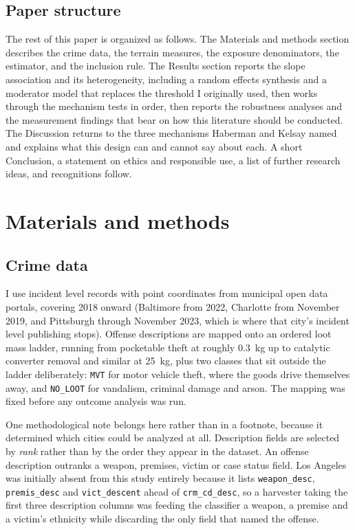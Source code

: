 \documentclass[12pt,letterpaper]{article}
\begin{document}
\subsection{Paper structure}

The rest of this paper is organized as follows. The Materials and methods section
describes the crime data, the terrain measures, the exposure denominators, the
estimator, and the inclusion rule. The Results section reports the slope association
and its heterogeneity, including a random effects synthesis and a moderator model
that replaces the threshold I originally used, then works through the mechanism
tests in order, then reports the robustness analyses and the measurement findings
that bear on how this literature should be conducted. The Discussion returns to the
three mechanisms Haberman and Kelsay named and explains what this design can and
cannot say about each. A short Conclusion, a statement on ethics and responsible use, a
list of further research ideas, and recognitions follow.

\section{Materials and methods}

\subsection{Crime data}

I use incident level records with point coordinates from municipal open data portals,
covering 2018 onward (Baltimore from 2022, Charlotte from November 2019, and
Pittsburgh through November 2023, which is where that city's incident level
publishing stops). Offense descriptions are mapped onto an ordered loot mass ladder,
running from pocketable theft at roughly 0.3~kg up to catalytic converter removal and
similar at 25~kg, plus two classes that sit outside the ladder deliberately:
\texttt{MVT} for motor vehicle theft, where the goods drive themselves away, and
\texttt{NO\_LOOT} for vandalism, criminal damage and arson. The mapping was fixed
before any outcome analysis was run.

One methodological note belongs here rather than in a footnote, because it determined
which cities could be analyzed at all. Description fields are selected by \emph{rank}
rather than by the order they appear in the dataset. An offense description outranks
a weapon, premises, victim or case status field. Los Angeles was initially absent from
this study entirely because it lists \texttt{weapon\_desc}, \texttt{premis\_desc} and
\texttt{vict\_descent} ahead of \texttt{crm\_cd\_desc}, so a harvester taking the
first three description columns was feeding the classifier a weapon, a premise and a
victim's ethnicity while discarding the only field that named the offense.
\end{document}
